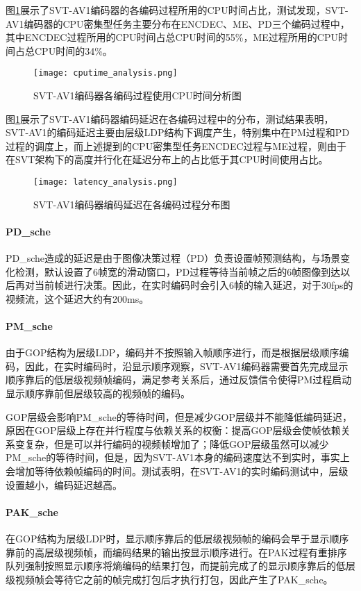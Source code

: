 图\ref{fig:cpu-ana}展示了SVT-AV1编码器的各编码过程所用的CPU时间占比，测试发现，SVT-AV1编码器的CPU密集型任务主要分布在ENCDEC、ME、PD三个编码过程中，其中ENCDEC过程所用的CPU时间占总CPU时间的55\%，ME过程所用的CPU时间占总CPU时间的34\%。

\begin{figure}[!htp]
		\centering
		\texttt{[image: cputime\_analysis.png]}
		\caption{SVT-AV1编码器各编码过程使用CPU时间分析图}
		\label{fig:cpu-ana}
\end{figure}
图\ref{fig:cpu-ana}展示了SVT-AV1编码器编码延迟在各编码过程中的分布，测试结果表明，SVT-AV1的编码延迟主要由层级LDP结构下调度产生，特别集中在PM过程和PD过程的调度上，而上述提到的CPU密集型任务ENCDEC过程与ME过程，则由于在SVT架构下的高度并行化在延迟分布上的占比低于其CPU时间使用占比。

\begin{figure}[!htp]
	\centering
	\texttt{[image: latency\_analysis.png]}
	\caption{SVT-AV1编码器编码延迟在各编码过程分布图}
	\label{fig:lat-ana}
\end{figure}

\paragraph{PD\_sche} PD\_sche造成的延迟是由于图像决策过程（PD）负责设置帧预测结构，与场景变化检测，默认设置了6帧宽的滑动窗口，PD过程等待当前帧之后的6帧图像到达以后再对当前帧进行决策。因此，在实时编码时会引入6帧的输入延迟，对于30fps的视频流，这个延迟大约有200ms。

\paragraph{PM\_sche} 由于GOP结构为层级LDP，编码并不按照输入帧顺序进行，而是根据层级顺序编码，因此，在实时编码时，沿显示顺序观察，SVT-AV1编码器需要首先完成显示顺序靠后的低层级视频帧编码，满足参考关系后，通过反馈信令使得PM过程启动显示顺序靠前但层级较高的视频帧的编码。

GOP层级会影响PM\_sche的等待时间，但是减少GOP层级并不能降低编码延迟，原因在GOP层级上存在并行程度与依赖关系的权衡：提高GOP层级会使帧依赖关系变复杂，但是可以并行编码的视频帧增加了；降低GOP层级虽然可以减少PM\_sche的等待时间，但是，因为SVT-AV1本身的编码速度达不到实时，事实上会增加等待依赖帧编码的时间。测试表明，在SVT-AV1的实时编码测试中，层级设置越小，编码延迟越高。

\paragraph{PAK\_sche} 在GOP结构为层级LDP时，显示顺序靠后的低层级视频帧的编码会早于显示顺序靠前的高层级视频帧，而编码结果的输出按显示顺序进行。在PAK过程有重排序队列强制按照显示顺序将熵编码的结果打包，而提前完成了的显示顺序靠后的低层级视频帧会等待它之前的帧完成打包后才执行打包，因此产生了PAK\_sche。


